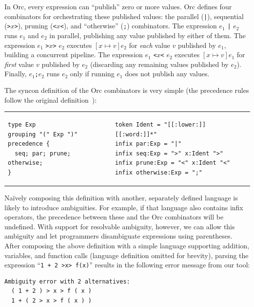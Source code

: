 \documentclass[runningheads]{llncs}
\newcommand{\ocaml}{\lstinline[language={[objective]caml}]}
\begin{document}
In Orc, every expression can ``publish'' zero or more values. Orc
defines four combinators for orchestrating these published values:
the parallel (\ocaml{|}), sequential (\ocaml{>}$x$\ocaml{>}),
pruning (\ocaml{<}$x$\ocaml{<}), and ``otherwise'' (\ocaml{;})
combinators.
%
The expression $e_1$ \ocaml{|} $e_2$ runs $e_1$ and
$e_2$ in parallel, publishing any value published by either of
them.
%
The expression $e_1$ \ocaml{>}$x$\ocaml{>} $e_2$ executes
$[x\mapsto v]e_2$ for \emph{each} value $v$ published by $e_1$,
building a concurrent pipeline.
%
The expression $e_1$ \ocaml{<}$x$\ocaml{<} $e_2$ executes
$[x\mapsto v]e_1$ for \emph{first} value $v$ published by $e_2$
(discarding any remaining values published by $e_2$).
%
Finally, $e_1$\ocaml{;}$e_2$ runs $e_2$ only if running $e_1$ does
not publish any values.

The syncon definition of the Orc combinators is very simple (the
precedence rules follow the original
definition~\cite{kitchinOrc2009}):

\begin{tabular}{ll}
\small
\begin{lstlisting}[language=syncon,boxpos=t]
type Exp
grouping "(" Exp ")"
precedence {
  seq; par; prune; otherwise;
}
\end{lstlisting}
&
\small
\begin{lstlisting}[language=syncon,boxpos=t]
token Ident = "[[:lower:]][[:word:]]*"
infix par:Exp = "|"
infix seq:Exp = ">" x:Ident ">"
infix prune:Exp = "<" x:Ident "<"
infix otherwise:Exp = ";"
\end{lstlisting}
\end{tabular}\smallskip

\noindent
Na\"{i}vely composing this definition with another, separately
defined language is likely to introduce ambiguities. For example,
if that language also contains infix operators, the precedence
between these and the Orc combinators will be undefined. With
support for resolvable ambiguity, however, we can allow this
ambiguity and let programmers disambiguate expressions using
parentheses. After composing the above definition with a simple
language supporting addition, variables, and function calls
(language definition omitted for brevity), parsing the expression
%
``\ocaml{1 + 2 >x> f(x)}''
%
results in the following error message from our tool:

{\small
\begin{lstlisting}[language={[objective]caml}]
Ambiguity error with 2 alternatives:
  ( 1 + 2 ) > x > f ( x )
  1 + ( 2 > x > f ( x ) )
\end{lstlisting}
}
\end{document}
